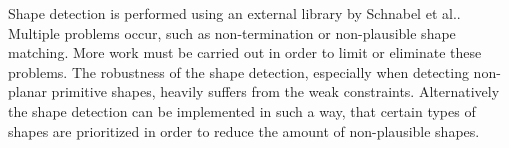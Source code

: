 Shape detection is performed using an external library by Schnabel et al.\cite{schnabel-2007-software}. Multiple problems occur, such as non-termination or non-plausible shape matching. More work must be carried out in order to limit or eliminate these problems. The robustness of the shape detection, especially when detecting non-planar primitive shapes, heavily suffers from the weak constraints. Alternatively the shape detection can be implemented in such a way, that certain types of shapes are prioritized in order to reduce the amount of non-plausible shapes. 
\\

